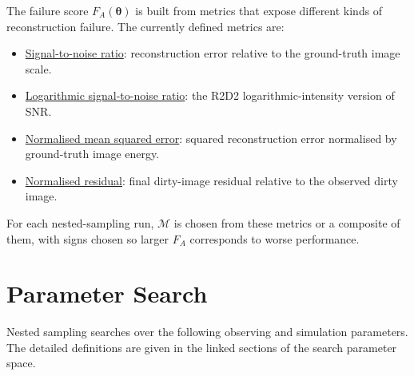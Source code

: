 \documentclass[11pt]{article}
\begin{document}
The failure score $F_A(\boldsymbol\theta)$ is built from metrics that expose different kinds of reconstruction failure.
The currently defined metrics are:
\begin{itemize}
    \item \hyperref[sec:metric-snr]{Signal-to-noise ratio}: reconstruction error relative to the ground-truth image scale.
    \item \hyperref[sec:metric-log-snr]{Logarithmic signal-to-noise ratio}: the R2D2 logarithmic-intensity version of SNR.
    \item \hyperref[sec:metric-nmse]{Normalised mean squared error}: squared reconstruction error normalised by ground-truth image energy.
    \item \hyperref[sec:metric-normalised-residual]{Normalised residual}: final dirty-image residual relative to the observed dirty image.
\end{itemize}
For each nested-sampling run, $\mathcal M$ is chosen from these metrics or a composite of them, with signs chosen so larger $F_A$ corresponds to worse performance.

\section{Parameter Search}

Nested sampling searches over the following observing and simulation parameters.
The detailed definitions are given in the linked sections of the search parameter space.
\end{document}
